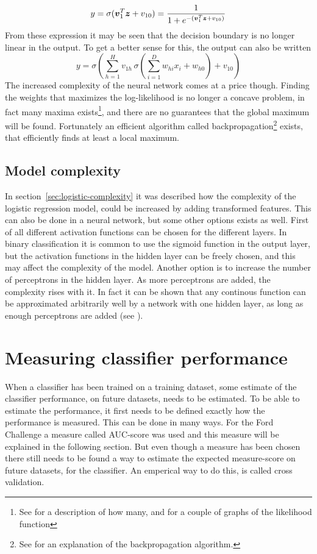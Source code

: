 \[
    y = \sigma(\boldsymbol{v}_1^T\boldsymbol{z}+v_{10}) = \frac{1}{1+e^{-(\boldsymbol{v}_1^T\boldsymbol{z}+v_{10})}}
\]
From these expression it may be seen that the decision boundary is no longer linear in the output. To get a better sense for this, the output can also be written
\[
    y = \sigma\left(\sum_{h=1}^H v_{1h}\,\sigma\left(\sum_{i=1}^D w_{hi}x_i + w_{h0}\right)+v_{10}\right)
\]
The increased complexity of the neural network comes at a price though. Finding the weights that maximizes the log-likelihood is no longer a concave problem, in fact many maxima exists\footnote{See \citet[p.237]{bishop} for a description of how many, and \citet[p.297]{duda01} for a couple of graphs of the likelihood function}, and there are no guarantees that the global maximum will be found. Fortunately an efficient algorithm called backpropagation\footnote{See \citet[p.249]{alpaydin10} for an explanation of the backpropagation algorithm.} exists, that efficiently finds at least a local maximum.


\subsection{Model complexity}
In section~\ref{sec:logistic-complexity} it was described how the complexity of the logistic regression model, could be increased by adding transformed features. This can also be done in a neural network, but some other options exists as well. First of all different activation functions can be chosen for the different layers. In binary classification it is common to use the sigmoid function in the output layer, but the activation functions in the hidden layer can be freely chosen, and this may affect the complexity of the model. Another option is to increase the number of perceptrons in the hidden layer. As more perceptrons are added, the complexity rises with it. In fact it can be shown that any continous function can be approximated arbitrarily well by a network with one hidden layer, as long as enough perceptrons are added (see \citet[p.287]{duda01}).


\section{Measuring classifier performance}\label{sec:classifier-performance}
When a classifier has been trained on a training dataset, some estimate of the classifier performance, on future datasets, needs to be estimated. To be able to estimate the performance, it first needs to be defined exactly how the performance is measured. This can be done in many ways. For the Ford Challenge a measure called AUC-score was used and this measure will be explained in the following section. But even though a measure has been chosen there still needs to be found a way to estimate the expected measure-score on future datasets, for the classifier. An emperical way to do this, is called cross validation.

